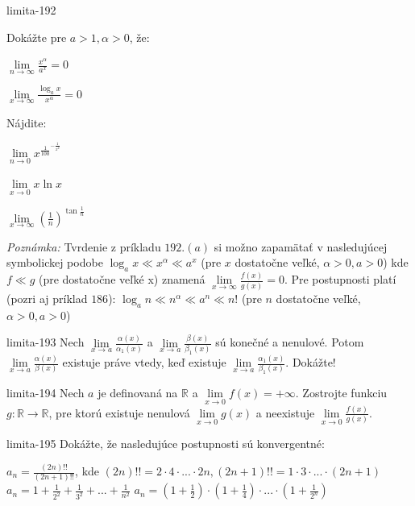 \begin{defproblem}{limita-192}
\begin{tasks}
\task Dokážte pre $a > 1,\alpha > 0$, že:
    \begin{enumerate*}
        \item $\lim\limits_{n \rightarrow \infty} \frac{x^{\alpha}}{a^x}=0$
        \item $\lim\limits_{x \rightarrow \infty} \frac{\log_a x}{x^\alpha}=0$
    \end{enumerate*}
\task Nájdite:
    \begin{enumerate*}
        \item $\lim\limits_{n \rightarrow 0} x^{\frac{1}{100}^{-\frac{1}{x^2}}}$
        \item $\lim\limits_{x \rightarrow 0} x \ln x$
        \item $\lim\limits_{x \rightarrow \infty} (\frac{1}{n})^{\tan \frac{1}{n}}$
    \end{enumerate*}
\end{tasks}
\textit{Poznámka:}
Tvrdenie z príkladu $192.(a)$ si možno zapamätať v nasledujúcej symbolickej
podobe $\log_a x\ll x^\alpha \ll a^x$ (pre $x$ dostatočne veľké, $\alpha >0,
a>0$) kde $f\ll g$ (pre dostatočne veľké x) znamená $\lim\limits_{x \rightarrow
\infty} \frac{f(x)}{g(x)}=0$. Pre postupnosti platí (pozri aj príklad $186$):
$\log_a n\ll n^\alpha\ll a^n\ll n!$ (pre $n$ dostatočne veľké,  $\alpha >0,
a>0$)
\end{defproblem}

\begin{defproblem}{limita-193}
Nech $\lim\limits_{x \rightarrow a} \frac{\alpha (x)}{\alpha_1 (x)}$ a
$\lim\limits_{x \rightarrow a} \frac{\beta (x)}{\beta_1(x)}$ sú konečné a
nenulové. Potom $\lim\limits_{x \rightarrow a} \frac{\alpha (x)}{\beta (x)}$
existuje práve vtedy, keď existuje $\lim\limits_{x \rightarrow a} \frac{\alpha_1
(x)}{\beta_1 (x)}$. Dokážte!
\end{defproblem}

\begin{defproblem}{limita-194}
Nech $a$ je definovaná na $\mathbb{R}$ a $\lim\limits_{x \rightarrow 0}
f(x)=+\infty$. Zostrojte funkciu $g: \mathbb{R} \rightarrow \mathbb{R}$, pre
ktorú existuje nenulová $\lim\limits_{x \rightarrow 0} g(x)$ a neexistuje
$\lim\limits_{x \rightarrow 0} \frac{f(x)}{g(x)}$.
\end{defproblem}

\begin{defproblem}{limita-195}
Dokážte, že nasledujúce postupnosti sú konvergentné:
\begin{tasks}
\task $a_n=\frac{(2n)!!}{(2n+1)!!}$, kde $(2n)!!=2\cdot4\cdot...\cdot2n,(2n+1)!!=1\cdot3\cdot...\cdot(2n+1)$
\task $a_n=1+\frac{1}{2^2}+\frac{1}{3^2}+...+\frac{1}{n^2}$
\task $a_n=(1+\frac{1}{2})\cdot(1+\frac{1}{4})\cdot...\cdot(1+\frac{1}{2^n})$
\end{tasks}
\end{defproblem}

